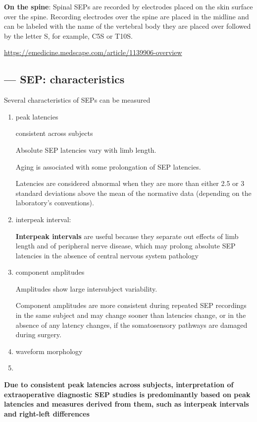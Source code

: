{\bf On the spine}: Spinal SEPs are recorded by electrodes placed on the skin
surface over the spine.  Recording electrodes over the spine are placed in the
midline and can be labeled with the name of the vertebral body they are placed
over followed by the letter S, for example, C5S or T10S.



\url{https://emedicine.medscape.com/article/1139906-overview}

\subsection{--- SEP: characteristics}
\label{sec:SEP-characteristics}


Several characteristics of SEPs can be measured
\begin{enumerate}
  \item peak latencies
  
  consistent across subjects

  Absolute SEP latencies vary with limb length.
  
  Aging is associated with some prolongation of SEP latencies.
  
   Latencies are considered abnormal when they are more than either 2.5 or 3
  standard deviations above the mean of the normative data (depending on the laboratory's conventions).
  
  \item interpeak interval:

  {\bf Interpeak intervals}  are useful because they separate out effects of
  limb length and of peripheral nerve disease, which may prolong absolute SEP
  latencies in the absence of central nervous system pathology 
  
  \item component amplitudes
  
  Amplitudes show large intersubject variability.
  
  Component amplitudes are more consistent during repeated SEP recordings in the
  same subject and may change sooner than latencies change, or in the absence of
  any latency changes, if the somatosensory pathways are damaged during surgery.
  
  \item waveform morphology
  
  \item 
\end{enumerate}
{\bf Due to consistent peak latencies across subjects, interpretation of
extraoperative diagnostic SEP studies is predominantly based on peak latencies
and measures derived from them, such as interpeak intervals and right-left
differences}


